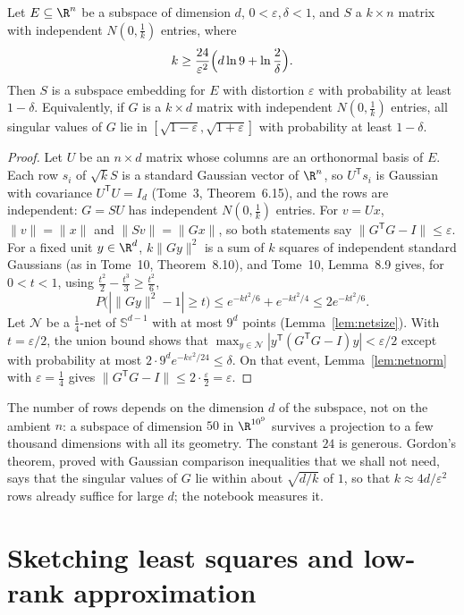 \begin{theorem}\label{thm:embedding}
Let $E\subseteq\R^n$ be a subspace of dimension $d$, $0<\varepsilon,\delta<1$, and $S$ a $k\times n$ matrix with independent $N(0,\frac1k)$ entries, where
\[
k\ge\frac{24}{\varepsilon^2}\Bigl(d\ln9+\ln\frac2\delta\Bigr).
\]
Then $S$ is a subspace embedding for $E$ with distortion $\varepsilon$ with probability at least $1-\delta$. Equivalently, if $G$ is a $k\times d$ matrix with independent
$N(0,\frac1k)$ entries, all singular values of $G$ lie in $[\sqrt{1-\varepsilon},\sqrt{1+\varepsilon}]$ with probability at least $1-\delta$.
\end{theorem}
\begin{proof}
Let $U$ be an $n\times d$ matrix whose columns are an orthonormal basis of $E$. Each row $s_i$ of $\sqrt kS$ is a standard Gaussian vector of $\R^n$, so $U^{\mathsf T}s_i$ is Gaussian
with covariance $U^{\mathsf T}U=I_d$ (Tome~3, Theorem~6.15), and the rows are independent: $G=SU$ has independent $N(0,\frac1k)$ entries. For $v=Ux$, $\|v\|=\|x\|$ and
$\|Sv\|=\|Gx\|$, so both statements say $\|G^{\mathsf T}G-I\|\le\varepsilon$. For a fixed unit $y\in\R^d$, $k\|Gy\|^2$ is a sum of $k$ squares of independent standard Gaussians
(as in Tome~10, Theorem~8.10), and Tome~10, Lemma~8.9 gives, for $0<t<1$, using $\frac{t^2}2-\frac{t^3}3\ge\frac{t^2}6$,
\[
P\bigl(|\|Gy\|^2-1|\ge t\bigr)\le e^{-kt^2/6}+e^{-kt^2/4}\le2e^{-kt^2/6}.
\]
Let $\mathcal N$ be a $\frac14$-net of $\mathbb S^{d-1}$ with at most $9^d$ points (Lemma~\ref{lem:netsize}). With $t=\varepsilon/2$, the union bound shows that
$\max_{y\in\mathcal N}|y^{\mathsf T}(G^{\mathsf T}G-I)y|<\varepsilon/2$ except with probability at most $2\cdot9^de^{-k\varepsilon^2/24}\le\delta$. On that event,
Lemma~\ref{lem:netnorm} with $\varepsilon=\frac14$ gives $\|G^{\mathsf T}G-I\|\le2\cdot\frac\varepsilon2=\varepsilon$.
\end{proof}

The number of rows depends on the dimension $d$ of the subspace, not on the ambient $n$: a subspace of dimension $50$ in $\R^{10^9}$ survives a projection to a few
thousand dimensions with all its geometry. The constant $24$ is generous. Gordon's theorem, proved with Gaussian comparison inequalities that we shall not need, says that the singular values of $G$ lie
within about $\sqrt{d/k}$ of $1$, so that $k\approx4d/\varepsilon^2$ rows already suffice for large $d$; the notebook measures it.

\section{Sketching least squares and low-rank approximation}\label{sec:sketching}

